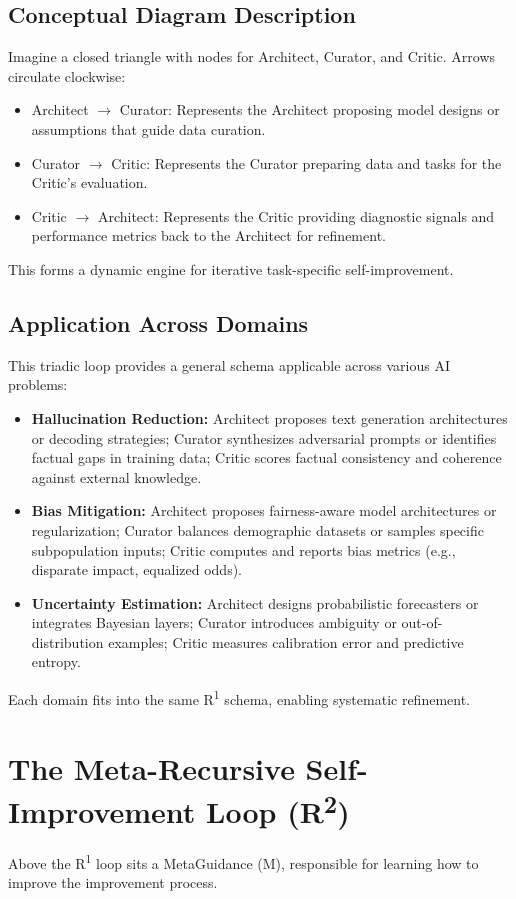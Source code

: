 \documentclass{article}
\begin{document}
\subsection{Conceptual Diagram Description}
Imagine a closed triangle with nodes for Architect, Curator, and Critic. Arrows circulate clockwise:
\begin{itemize}
    \item Architect $\rightarrow$ Curator: Represents the Architect proposing model designs or assumptions that guide data curation.
    \item Curator $\rightarrow$ Critic: Represents the Curator preparing data and tasks for the Critic's evaluation.
    \item Critic $\rightarrow$ Architect: Represents the Critic providing diagnostic signals and performance metrics back to the Architect for refinement.
\end{itemize}
This forms a dynamic engine for iterative task-specific self-improvement.

\subsection{Application Across Domains}
This triadic loop provides a general schema applicable across various AI problems:
\begin{itemize}
    \item \textbf{Hallucination Reduction:} Architect proposes text generation architectures or decoding strategies; Curator synthesizes adversarial prompts or identifies factual gaps in training data; Critic scores factual consistency and coherence against external knowledge.
    \item \textbf{Bias Mitigation:} Architect proposes fairness-aware model architectures or regularization; Curator balances demographic datasets or samples specific subpopulation inputs; Critic computes and reports bias metrics (e.g., disparate impact, equalized odds).
    \item \textbf{Uncertainty Estimation:} Architect designs probabilistic forecasters or integrates Bayesian layers; Curator introduces ambiguity or out-of-distribution examples; Critic measures calibration error and predictive entropy.
\end{itemize}
Each domain fits into the same R\textsuperscript{1} schema, enabling systematic refinement.

\section{The Meta-Recursive Self-Improvement Loop (R\textsuperscript{2})}
Above the R\textsuperscript{1} loop sits a MetaGuidance (M), responsible for learning how to improve the improvement process.
\end{document}
